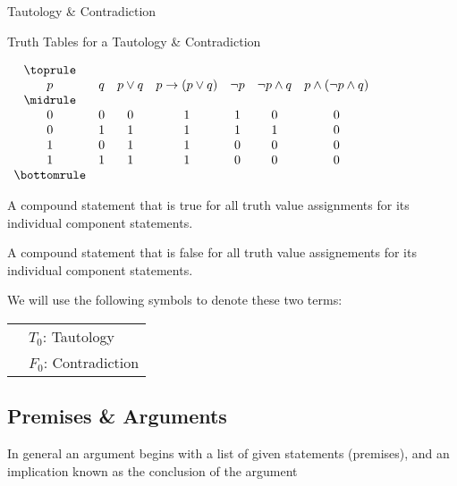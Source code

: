 \documentclass[../../../main.tex]{subfiles}
\begin{document}
\begin{table}[!htb]
\caption{Tautology \& Contradiction}
    \centering
    \begin{subtable}{\linewidth}
        \centering
        \caption{Truth Tables for a Tautology \& Contradiction}
        \label{tbl:tautology-contradiction}
        $\begin{array}{ *{7}{c} }
            \toprule \\
            p & q & p \lor q & p \to (p \lor q) & \neg p & \neg p \land q & p \land (\neg p \land q) \\
            \midrule \\
            0 & 0 & 0 & 1 & 1 & 0 & 0 \\
            0 & 1 & 1 & 1 & 1 & 1 & 0 \\
            1 & 0 & 1 & 1 & 0 & 0 & 0 \\
            1 & 1 & 1 & 1 & 0 & 0 & 0 \\
            \bottomrule
        \end{array}$
    \end{subtable}%
\end{table}

\begin{definition}[Tautology]
A compound statement that is true for all truth value assignments for its individual component statements.
\end{definition}

\begin{definition}[Contradiction]
A compound statement that is false for all truth value assignements for its individual component statements.
\end{definition}

We will use the following symbols to denote these two terms:

\newcommand{\T}{T_0}
\newcommand{\F}{F_0}

\begin{tabularx}{0.80\linewidth}{@{}lX}
    & $\T$: Tautology \\
    & $\F$: Contradiction
\end{tabularx}

\subsection{Premises \& Arguments}

In general an argument begins with a list of given statements (premises),
and an implication known as the conclusion of the argument
\end{document}
